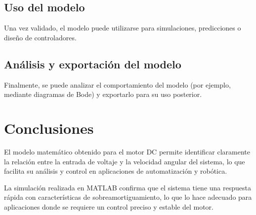 \documentclass[conference]{IEEEtran}
\begin{document}
	\subsection{Uso del modelo}
	Una vez validado, el modelo puede utilizarse para simulaciones, predicciones o diseño de controladores.
	
	\subsection{Análisis y exportación del modelo}
	Finalmente, se puede analizar el comportamiento del modelo (por ejemplo, mediante diagramas de Bode) y exportarlo para su uso posterior.
	
	\section{Conclusiones}
	
	El modelo matemático obtenido para el motor DC permite identificar claramente la relación entre la entrada de voltaje y la velocidad angular del sistema, lo que facilita su análisis y control en aplicaciones de automatización y robótica.
	
	La simulación realizada en MATLAB confirma que el sistema tiene una respuesta rápida con características de sobreamortiguamiento, lo que lo hace adecuado para aplicaciones donde se requiere un control preciso y estable del motor.
	
	
	
\end{document}
